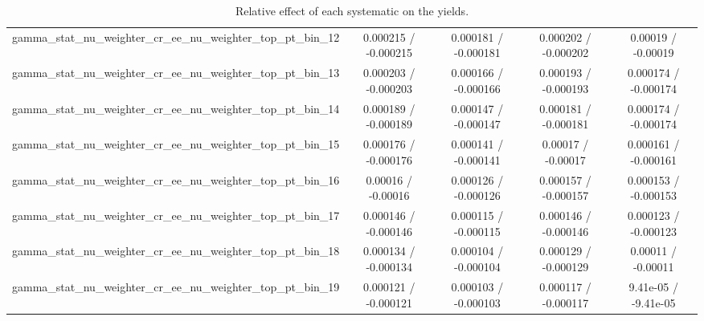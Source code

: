 \documentclass[10pt]{article}
\begin{document}
\begin{table}[htbp]
\begin{center}
\begin{tabular}{|c|c|c|c|c|}
  gamma_stat_nu_weighter_cr_ee_nu_weighter_top_pt_bin_12 & 0.000215 / -0.000215 & 0.000181 / -0.000181 & 0.000202 / -0.000202 & 0.00019 / -0.00019 \\ 
  gamma_stat_nu_weighter_cr_ee_nu_weighter_top_pt_bin_13 & 0.000203 / -0.000203 & 0.000166 / -0.000166 & 0.000193 / -0.000193 & 0.000174 / -0.000174 \\ 
  gamma_stat_nu_weighter_cr_ee_nu_weighter_top_pt_bin_14 & 0.000189 / -0.000189 & 0.000147 / -0.000147 & 0.000181 / -0.000181 & 0.000174 / -0.000174 \\ 
  gamma_stat_nu_weighter_cr_ee_nu_weighter_top_pt_bin_15 & 0.000176 / -0.000176 & 0.000141 / -0.000141 & 0.00017 / -0.00017 & 0.000161 / -0.000161 \\ 
  gamma_stat_nu_weighter_cr_ee_nu_weighter_top_pt_bin_16 & 0.00016 / -0.00016 & 0.000126 / -0.000126 & 0.000157 / -0.000157 & 0.000153 / -0.000153 \\ 
  gamma_stat_nu_weighter_cr_ee_nu_weighter_top_pt_bin_17 & 0.000146 / -0.000146 & 0.000115 / -0.000115 & 0.000146 / -0.000146 & 0.000123 / -0.000123 \\ 
  gamma_stat_nu_weighter_cr_ee_nu_weighter_top_pt_bin_18 & 0.000134 / -0.000134 & 0.000104 / -0.000104 & 0.000129 / -0.000129 & 0.00011 / -0.00011 \\ 
  gamma_stat_nu_weighter_cr_ee_nu_weighter_top_pt_bin_19 & 0.000121 / -0.000121 & 0.000103 / -0.000103 & 0.000117 / -0.000117 & 9.41e-05 / -9.41e-05 \\ 
\hline 
\end{tabular} 
\caption{Relative effect of each systematic on the yields.} 
\end{center} 
\end{table} 
\end{document}
